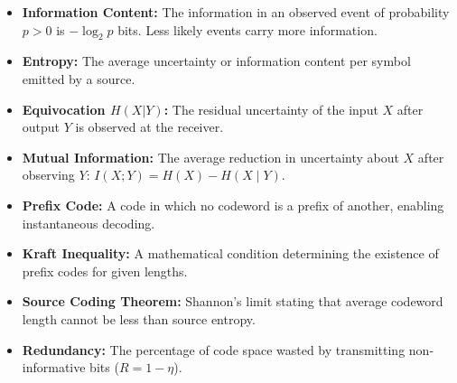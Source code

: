 \documentclass[12pt,a4paper]{article}
\begin{document}
\begin{tcolorbox}[defbox, title={\textbf{One-Line Definitions}}]
\begin{itemize}[leftmargin=*, itemsep=2.5pt, topsep=0pt]
  \item \textbf{Information Content:} The information in an observed event of probability $p>0$ is $-\log_2 p$ bits. Less likely events carry more information.
  \item \textbf{Entropy:} The average uncertainty or information content per symbol emitted by a source.
  \item \textbf{Equivocation $H(X|Y)$:} The residual uncertainty of the input $X$ after output $Y$ is observed at the receiver.
  \item \textbf{Mutual Information:} The average reduction in uncertainty about $X$ after observing $Y$: $I(X;Y)=H(X)-H(X\mid Y)$.
  \item \textbf{Prefix Code:} A code in which no codeword is a prefix of another, enabling instantaneous decoding.
  \item \textbf{Kraft Inequality:} A mathematical condition determining the existence of prefix codes for given lengths.
  \item \textbf{Source Coding Theorem:} Shannon's limit stating that average codeword length cannot be less than source entropy.
  \item \textbf{Redundancy:} The percentage of code space wasted by transmitting non-informative bits ($R = 1 - \eta$).
\end{itemize}
\end{tcolorbox}
\end{document}
